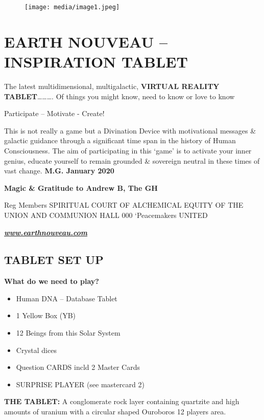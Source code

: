 \begin{figure}
\centering
\texttt{[image: media/image1.jpeg]}
\caption{}
\end{figure}

\section{EARTH NOUVEAU -- INSPIRATION
TABLET}\label{earth-nouveau-inspiration-tablet}

The latest multidimensional, multigalactic, \textbf{VIRTUAL REALITY
TABLET}\ldots{}\ldots{}\ldots{}. Of things you might know, need to know
or love to know

Participate -- Motivate - Create!

This is not really a game but a Divination Device with motivational
messages \& galactic guidance through a significant time span in the
history of Human Consciousness. The aim of participating in this `game'
is to activate your inner genius, educate yourself to remain grounded \&
sovereign neutral in these times of vast change. \textbf{M.G. January
2020}

\textbf{Magic \& Gratitude to Andrew B, The GH}

Reg Members SPIRITUAL COURT OF ALCHEMICAL EQUITY OF THE UNION AND
COMMUNION HALL 000 `Peacemakers UNITED

\href{http://www.earthnouveau.com/}{\textbf{\emph{www.earthnouveau.com}}}

\subsection{TABLET SET UP}\label{tablet-set-up}

\textbf{What do we need to play?}

\begin{itemize}
\item
  Human DNA -- Database Tablet
\item
  1 Yellow Box (YB)
\item
  12 Beings from this Solar System
\item
  Crystal dices
\item
  Question CARDS incld 2 Master Cards
\item
  SURPRISE PLAYER (see mastercard 2)
\end{itemize}

\textbf{THE TABLET:} A conglomerate rock layer containing quartzite and
high amounts of uranium with a circular shaped Ouroboros 12 players
area.

